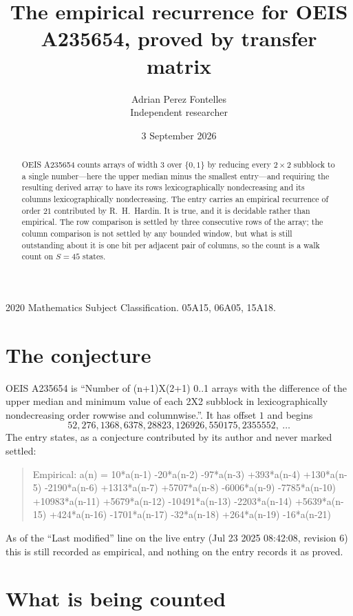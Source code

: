 \documentclass[11pt,a4paper]{article}
\title{The empirical recurrence for OEIS A235654, proved by transfer matrix}
\author{Adrian Perez Fontelles\\ \small Independent researcher}
\date{3 September 2026}
\theoremstyle{plain}
\theoremstyle{definition}
\begin{document}
\maketitle

\begin{abstract}
OEIS A235654 counts arrays of width $3$ over $\{0,1\}$ by reducing every $2\times2$ subblock to a
single number---here the upper median minus the smallest entry---and requiring the resulting derived array to have its rows
lexicographically nondecreasing and its columns lexicographically nondecreasing. The entry carries an
empirical recurrence of order $21$ contributed by R.~H.~Hardin. It is true, and it is
decidable rather than empirical. The row comparison is settled by three consecutive rows of the
array; the column comparison is not settled by any bounded window, but what is still outstanding
about it is one bit per adjacent pair of columns, so the count is a walk count on $S=45$
states.
\end{abstract}

\noindent\small 2020 Mathematics Subject Classification. 05A15, 06A05, 15A18.\normalsize

\section{The conjecture}

OEIS A235654 is ``Number of (n+1)X(2+1) 0..1 arrays with the difference of the upper median and minimum value of each 2X2 subblock in lexicographically nondecreasing order rowwise and columnwise.''. It has offset $1$ and begins
\[
52, 276, 1368, 6378, 28823, 126926, 550175, 2355552,\ \dots
\]
The entry states, as a conjecture contributed by its author and never marked settled:
\begin{quote}
Empirical: a(n) = 10*a(n-1) -20*a(n-2) -97*a(n-3) +393*a(n-4) +130*a(n-5) -2190*a(n-6) +1313*a(n-7) +5707*a(n-8) -6006*a(n-9) -7785*a(n-10) +10983*a(n-11) +5679*a(n-12) -10491*a(n-13) -2203*a(n-14) +5639*a(n-15) +424*a(n-16) -1701*a(n-17) -32*a(n-18) +264*a(n-19) -16*a(n-21)
\end{quote}
As of the ``Last modified'' line on the live entry (Jul 23 2025 08:42:08, revision 6) this is still
recorded as empirical, and nothing on the entry records it as proved.

\section{What is being counted}
\end{document}
